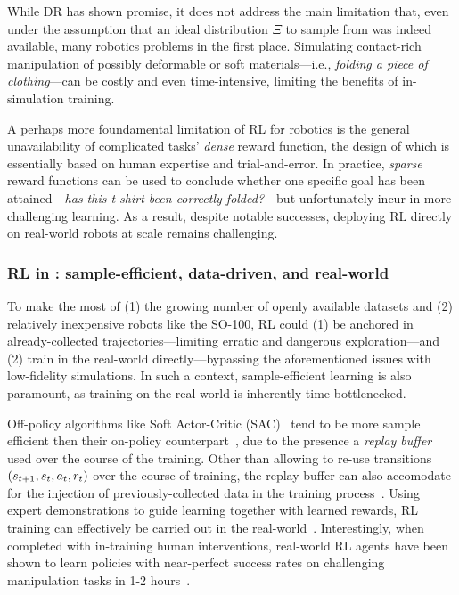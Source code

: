 While DR has shown promise, it does not address the main limitation that, even under the assumption that an ideal distribution \( \Xi \) to sample from was indeed available, many robotics problems  in the first place.
Simulating contact-rich manipulation of possibly deformable or soft materials---i.e., \emph{folding a piece of clothing}---can be costly and even time-intensive, limiting the benefits of in-simulation training.

A perhaps more foundamental limitation of RL for robotics is the general unavailability of complicated tasks' \emph{dense} reward function, the design of which is essentially based on human expertise and trial-and-error.
In practice, \emph{sparse} reward functions can be used to conclude whether one specific goal has been attained---\emph{has this t-shirt been correctly folded?}---but unfortunately incur in more challenging learning.
As a result, despite notable successes, deploying RL directly on real-world robots at scale remains challenging.

\subsubsection{RL in \lerobot: sample-efficient, data-driven, and real-world}

To make the most of (1) the growing number of openly available datasets and (2) relatively inexpensive robots like the SO-100, RL could (1) be anchored in already-collected trajectories---limiting erratic and dangerous exploration---and (2) train in the real-world directly---bypassing the aforementioned issues with low-fidelity simulations.
In such a context, sample-efficient learning is also paramount, as training on the real-world is inherently time-bottlenecked.

Off-policy algorithms like Soft Actor-Critic (SAC)~\citep{haarnojaSoftActorCriticOffPolicy2018} tend to be more sample efficient then their on-policy counterpart~\citep{schulmanProximalPolicyOptimization2017}, due to the presence a \emph{replay buffer} used over the course of the training.
Other than allowing to re-use transitions \( (s_{t+1}, s_t, a_t, r_t) \) over the course of training, the replay buffer can also accomodate for the injection of previously-collected data in the training process~\citep{ballEfficientOnlineReinforcement2023}.
Using expert demonstrations to guide learning together with learned rewards, RL training can effectively be carried out in the real-world~\citep{luoSERLSoftwareSuite2025}.
Interestingly, when completed with in-training human interventions, real-world RL agents have been shown to learn policies with near-perfect success rates on challenging manipulation tasks in 1-2 hours~\citep{luoPreciseDexterousRobotic2024}.

